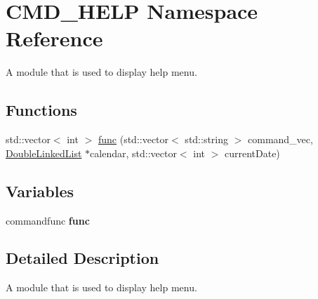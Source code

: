 \hypertarget{namespaceCMD__HELP}{\section{C\-M\-D\-\_\-\-H\-E\-L\-P Namespace Reference}
\label{namespaceCMD__HELP}
}


A module that is used to display help menu.  


\subsection*{Functions}
\begin{DoxyCompactItemize}
\item 
std\-::vector$<$ int $>$ \hyperlink{group__CMD__HELP_gaf4e3169012caacaa594ad61ec3a57ff4}{func} (std\-::vector$<$ std\-::string $>$ command\-\_\-vec, \hyperlink{classDoubleLinkedList}{Double\-Linked\-List} $\ast$calendar, std\-::vector$<$ int $>$ current\-Date)
\end{DoxyCompactItemize}
\subsection*{Variables}
\begin{DoxyCompactItemize}
\item 
\hypertarget{namespaceCMD__HELP_a8df2f869a6caf5a66b856ab527eb2e32}{commandfunc {\bfseries func}}\label{namespaceCMD__HELP_a8df2f869a6caf5a66b856ab527eb2e32}

\end{DoxyCompactItemize}


\subsection{Detailed Description}
A module that is used to display help menu. 